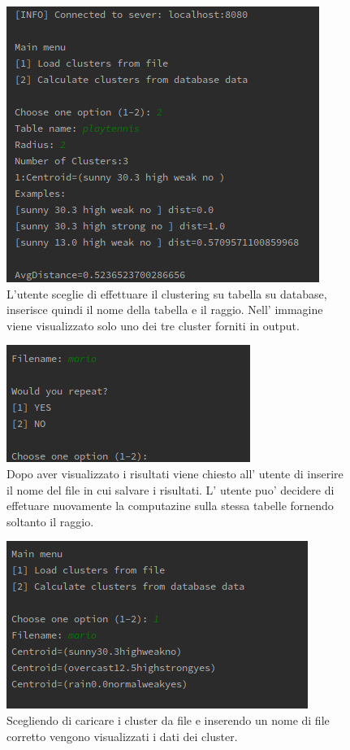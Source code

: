 \documentclass{article}
\begin{document}
        \begin{figure}[!ht]
            \includegraphics{BASE2}
            \caption{L'utente sceglie di effettuare il clustering su tabella su
            database, inserisce quindi il nome della tabella e il raggio. Nell'
            immagine viene visualizzato solo uno dei tre cluster forniti in output.}   
            \label{fig:2}
        \end{figure}

        \begin{figure}[H]
            \includegraphics{BASE4}
            \caption{Dopo aver visualizzato i risultati viene chiesto all'
            utente di inserire il nome del file in cui salvare i risultati. L'
            utente puo' decidere di effetuare nuovamente la computazine sulla
            stessa tabelle fornendo soltanto il raggio.}   
            \label{fig:3}
        \end{figure}


        \begin{figure}[H]
            \includegraphics{BASE5}
            \caption{Scegliendo di caricare i cluster da file e inserendo un 
            nome di file corretto vengono visualizzati i dati dei cluster.}   
            \label{fig:4}
        \end{figure} 
        \FloatBarrier
       
\end{document}
